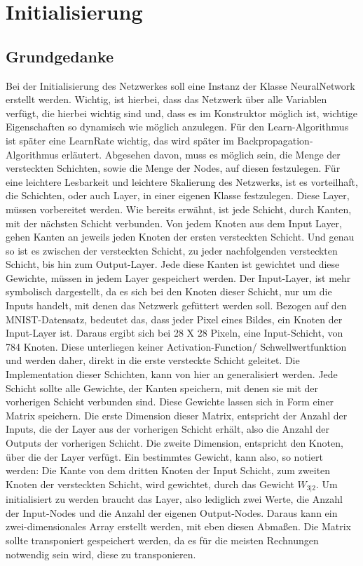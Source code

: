 \documentclass[12pt]{article}
\begin{document}
\section{Initialisierung}
\subsection{Grundgedanke}Bei der Initialisierung des Netzwerkes soll eine Instanz der Klasse NeuralNetwork erstellt werden. Wichtig, ist hierbei, dass das Netzwerk über alle Variablen verfügt, die hierbei wichtig sind und, dass es im Konstruktor möglich ist, wichtige Eigenschaften so dynamisch wie möglich anzulegen. Für den Learn-Algorithmus ist später eine LearnRate wichtig, das wird später im Backpropagation-Algorithmus erläutert. Abgesehen davon, muss es möglich sein, die Menge der versteckten Schichten, sowie die Menge der Nodes, auf diesen festzulegen. Für eine leichtere Lesbarkeit und leichtere Skalierung des Netzwerks, ist es vorteilhaft, die Schichten, oder auch Layer, in einer eigenen Klasse festzulegen. Diese Layer, müssen vorbereitet werden. Wie bereits erwähnt, ist jede Schicht, durch Kanten, mit der nächsten Schicht verbunden. Von jedem Knoten aus dem Input Layer, gehen Kanten an jeweils jeden Knoten der ersten versteckten Schicht. Und genau so ist es zwischen der versteckten Schicht, zu jeder nachfolgenden versteckten Schicht, bis hin zum Output-Layer. Jede diese Kanten ist gewichtet und diese Gewichte, müssen in jedem Layer gespeichert werden. Der Input-Layer, ist mehr symbolisch dargestellt, da es sich bei den Knoten dieser Schicht, nur um die Inputs handelt, mit denen das Netzwerk gefüttert werden soll. Bezogen auf den MNIST-Datensatz, bedeutet das, dass jeder Pixel eines Bildes, ein Knoten der Input-Layer ist. Daraus ergibt sich bei 28 X 28 Pixeln, eine Input-Schicht, von 784 Knoten. Diese unterliegen keiner Activation-Function/ Schwellwertfunktion und werden daher, direkt in die erste versteckte Schicht geleitet. Die Implementation dieser Schichten, kann von hier an generalisiert werden. Jede Schicht sollte alle Gewichte, der Kanten speichern, mit denen sie mit der vorherigen Schicht verbunden sind. Diese Gewichte lassen sich in Form einer Matrix speichern. Die erste Dimension dieser Matrix, entspricht der Anzahl der Inputs, die der Layer aus der vorherigen Schicht erhält, also die Anzahl der Outputs der vorherigen Schicht. Die zweite Dimension, entspricht den Knoten, über die der Layer verfügt. Ein bestimmtes Gewicht, kann also, so notiert werden: Die Kante von dem dritten Knoten der Input Schicht, zum zweiten Knoten der versteckten Schicht, wird gewichtet, durch das Gewicht $W_{3|2}$. Um initialisiert zu werden braucht das Layer, also lediglich zwei Werte, die Anzahl der Input-Nodes und die Anzahl der eigenen Output-Nodes. Daraus kann ein zwei-dimensionales Array erstellt werden, mit eben diesen Abmaßen. Die Matrix sollte  transponiert gespeichert werden, da es für die meisten Rechnungen notwendig sein wird, diese zu transponieren.
\end{document}
